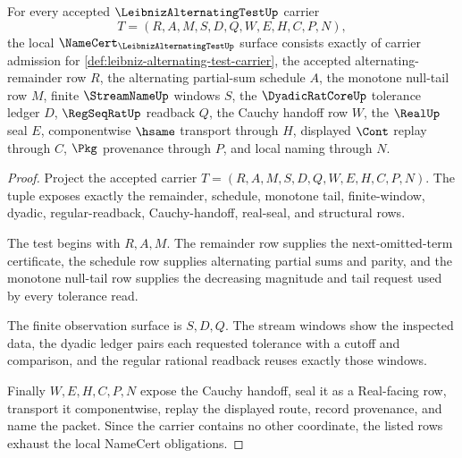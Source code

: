 \begin{theorem}
\label{thm:leibniz-alternating-test-namecert-obligations}
For every accepted $\LeibnizAlternatingTestUp$ carrier
$$
T=(R,A,M,S,D,Q,W,E,H,C,P,N),
$$
the local $\NameCert_{\LeibnizAlternatingTestUp}$ surface consists exactly of carrier admission for \autoref{def:leibniz-alternating-test-carrier}, the accepted alternating-remainder row $R$, the alternating partial-sum schedule $A$, the monotone null-tail row $M$, finite $\StreamNameUp$ windows $S$, the $\DyadicRatCoreUp$ tolerance ledger $D$, $\RegSeqRatUp$ readback $Q$, the Cauchy handoff row $W$, the $\RealUp$ seal $E$, componentwise $\hsame$ transport through $H$, displayed $\Cont$ replay through $C$, $\Pkg$ provenance through $P$, and local naming through $N$.
\end{theorem}
\begin{proof}
Project the accepted carrier $T=(R,A,M,S,D,Q,W,E,H,C,P,N)$. The tuple exposes exactly the remainder, schedule, monotone tail, finite-window, dyadic, regular-readback, Cauchy-handoff, real-seal, and structural rows.

The test begins with $R,A,M$. The remainder row supplies the next-omitted-term certificate, the schedule row supplies alternating partial sums and parity, and the monotone null-tail row supplies the decreasing magnitude and tail request used by every tolerance read.

The finite observation surface is $S,D,Q$. The stream windows show the inspected data, the dyadic ledger pairs each requested tolerance with a cutoff and comparison, and the regular rational readback reuses exactly those windows.

Finally $W,E,H,C,P,N$ expose the Cauchy handoff, seal it as a Real-facing row, transport it componentwise, replay the displayed route, record provenance, and name the packet. Since the carrier contains no other coordinate, the listed rows exhaust the local NameCert obligations.
\end{proof}

